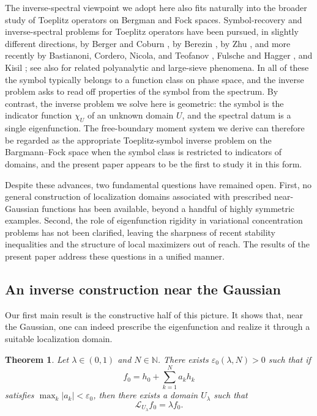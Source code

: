\documentclass[a4paper,11pt,reqno]{amsart}
\numberwithin{equation}{section}
\theoremstyle{plain} %
\newtheorem{theorem}{Theorem}
\theoremstyle{definition} %
\theoremstyle{remark}
\begin{document}
The inverse-spectral viewpoint we adopt here also fits naturally into the broader study of Toeplitz operators on Bergman and Fock spaces. Symbol-recovery and inverse-spectral problems for Toeplitz operators have been pursued, in slightly different directions, by Berger and Coburn \cite{Berger-Coburn-Symbol,Berger-Coburn,Berger-Coburn-Heat}, by Berezin \cite{Berezin}, by Zhu \cite{Zhu}, and more recently by Bastianoni, Cordero, Nicola, and Teofanov \cite{Bastianoni-Cordero-Nicola,Bastianoni-Teofanov}, Fulsche and Hagger \cite{Fulsche-Hagger}, and Kisil \cite{Kisil-CrossToeplitz}; see also \cite{abreu2021donoho} for related polyanalytic and large-sieve phenomena. In all of these the symbol typically belongs to a function class on phase space, and the inverse problem asks to read off properties of the symbol from the spectrum. By contrast, the inverse problem we solve here is geometric: the symbol is the indicator function $\chi_U$ of an unknown domain $U$, and the spectral datum is a single eigenfunction. The free-boundary moment system we derive can therefore be regarded as the appropriate Toeplitz-symbol inverse problem on the Bargmann--Fock space when the symbol class is restricted to indicators of domains, and the present paper appears to be the first to study it in this form.

Despite these advances, two fundamental questions have remained open. First, no general construction of localization domains associated with prescribed near-Gaussian functions has been available, beyond a handful of highly symmetric examples. Second, the role of eigenfunction rigidity in variational concentration problems has not been clarified, leaving the sharpness of recent stability inequalities and the structure of local maximizers out of reach. The results of the present paper address these questions in a unified manner.

\subsection{An inverse construction near the Gaussian}

Our first main result is the constructive half of this picture. It shows that, near the Gaussian, one can indeed prescribe the eigenfunction and realize it through a suitable localization domain.

\begin{theorem}\label{thm:perturb}
Let $\lambda\in (0,1)$ and $N\in\mathbb N$. There exists $\varepsilon_0(\lambda,N)>0$ such that if
\[
f_0 = h_0 + \sum_{k=1}^N a_k h_k
\]
satisfies $\max_k |a_k|<\varepsilon_0$, then there exists a domain $U_\lambda$ such that
\[
\mathcal L_{U_\lambda} f_0 = \lambda f_0 .
\]
\end{theorem}
\end{document}
